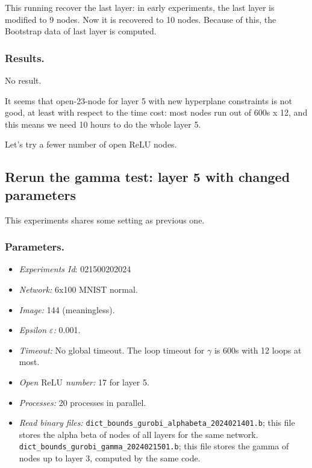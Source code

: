\documentclass{llncs}
\newcommand{\ReLU}{\mathrm{ReLU}}
\begin{document}
This running recover the last layer: in early experiments, the last layer is modified to 9 nodes. Now it is recovered to 10 nodes. Because of this, the Bootstrap data of last layer is computed.

\subsubsection*{Results.}

No result.

It seems that open-23-node for layer 5 with new hyperplane constraints is not good, at least with respect to the time cost: most nodes run out of 600s x 12, and this means we need 10 hours to do the whole layer 5.

Let's try a fewer number of open $\ReLU$ nodes.


\subsection{Rerun the gamma test: layer 5 with changed parameters}

This experiments shares some setting as previous one. 

\subsubsection*{Parameters.}

\begin{itemize}
	\item\emph{Experiments Id}: 021500202024

\item\emph{Network:} 6x100 MNIST normal. 

\item\emph{Image:} 144 (meaningless).

\item\emph{Epsilon $\varepsilon$:} 0.001.

\item\emph{Timeout:} No global timeout. The loop timeout for $\gamma$ is 600s with 12 loops at most.

\item\emph{Open $\ReLU$ number:} 17 for layer 5. 

\item\emph{Processes:} 20 processes in parallel.

\item\emph{Read binary files:} \verb*|dict_bounds_gurobi_alphabeta_2024021401.b|; this file stores the alpha beta of nodes of all layers for the same network. \verb*|dict_bounds_gurobi_gamma_2024021501.b|; this file stores the gamma of nodes up to layer 3, computed by the same code.
\end{itemize}
\end{document}
